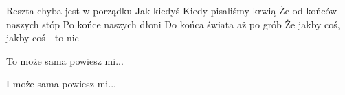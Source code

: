 \documentclass[../../../songbook.tex]{subfiles}
\begin{document}
Reszta chyba jest w porządku  \newline
Jak kiedyś Kiedy pisaliśmy krwią  \newline
Że od końców naszych stóp  \newline
Po końce naszych dłoni  \newline
Do końca świata aż po grób  \newline
Że jakby coś, jakby coś - to nic \newline
 
\-\hspace{1cm} To może sama powiesz mi... \newline 

\-\hspace{1cm} I może sama powiesz mi...  \newline
\end{document}
